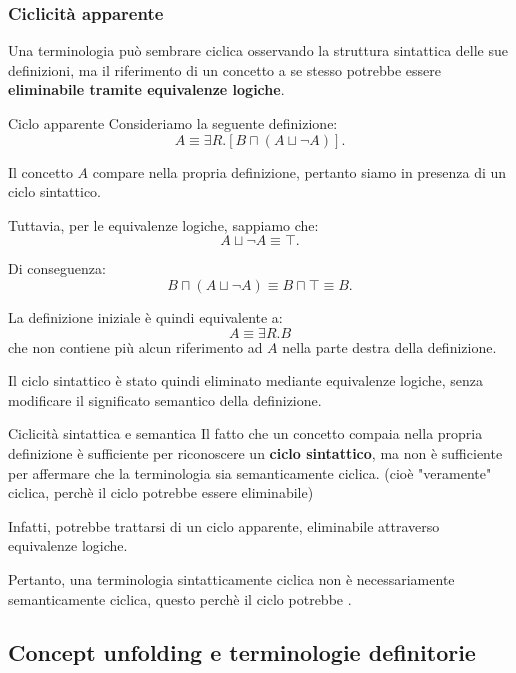 \newpage

\subsubsection{Ciclicità apparente}

Una terminologia può sembrare ciclica osservando la struttura
sintattica delle sue definizioni, ma il riferimento di un
concetto a se stesso potrebbe essere \textbf{eliminabile
tramite equivalenze logiche}.

\begin{example}{Ciclo apparente}
    Consideriamo la seguente definizione:
    \[
        A \equiv \exists R.\left[B \sqcap (A \sqcup \neg A)\right].
    \]

    Il concetto $A$ compare nella propria definizione,
    pertanto siamo in presenza di un ciclo sintattico.

    Tuttavia, per le equivalenze logiche, sappiamo che:
    \[
        A \sqcup \neg A \equiv \top.
    \]

    Di conseguenza:
    \[
        B \sqcap (A \sqcup \neg A)
        \equiv B \sqcap \top
        \equiv B.
    \]

    La definizione iniziale è quindi equivalente a:
    \[
        A \equiv \exists R.B
    \]
    che non contiene più alcun riferimento ad $A$ nella
    parte destra della definizione.

    Il ciclo sintattico è stato quindi eliminato mediante
    equivalenze logiche, senza modificare il significato
    semantico della definizione.
\end{example}


\begin{observation}{Ciclicità sintattica e semantica}
    Il fatto che un concetto compaia nella propria
    definizione è sufficiente per riconoscere un
    \textbf{ciclo sintattico}, ma non è sufficiente
    per affermare che la terminologia sia semanticamente ciclica. (cioè "veramente" ciclica, perchè il ciclo potrebbe essere eliminabile)

    Infatti, potrebbe trattarsi di un ciclo apparente,
    eliminabile attraverso equivalenze logiche.

    Pertanto, una terminologia sintatticamente ciclica
    non è necessariamente semanticamente ciclica, questo perchè il ciclo potrebbe .
\end{observation}
\subsection{Concept unfolding e terminologie definitorie}

